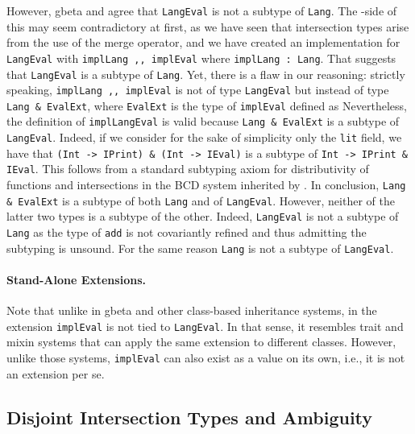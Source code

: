 However, gbeta and \name agree that \lstinline{LangEval} is not a subtype of
\lstinline{Lang}. The \name-side of this may seem contradictory at first, as we
have seen that intersection types arise from the use of the merge operator, and
we have created an implementation for \lstinline{LangEval} with
\lstinline{implLang ,, implEval} where \lstinline{implLang : Lang}. That
suggests that \lstinline{LangEval} is a subtype of \lstinline{Lang}.
Yet, there is a flaw in our reasoning:
strictly speaking, \lstinline{implLang ,, implEval} is not of
type \lstinline{LangEval} but instead of type \lstinline{Lang & EvalExt}, where
\lstinline{EvalExt} is the type of \lstinline{implEval} defined as
Nevertheless, the definition of \lstinline{implLangEval} is valid because
\lstinline{Lang & EvalExt} is a subtype of \lstinline{LangEval}.
Indeed, if we consider for the sake of simplicity only the \lstinline{lit}
field, we have that \lstinline{(Int -> IPrint) & (Int -> IEval)} is a
subtype of \lstinline{Int -> IPrint & IEval}. This follows from a standard
subtyping axiom for distributivity of functions and intersections in the BCD system inherited by \name.
In conclusion, \lstinline{Lang & EvalExt} is a subtype of both \lstinline{Lang}
and of \lstinline{LangEval}. However, neither of the latter two types is a subtype of the other.
Indeed, \lstinline{LangEval} is not a subtype of \lstinline{Lang} as the type
of \lstinline{add} is not covariantly refined and thus admitting the subtyping
is unsound. For the same reason \lstinline{Lang} is not a subtype of \lstinline{LangEval}.

\paragraph{Stand-Alone Extensions.}
Note that unlike in gbeta and other class-based inheritance systems, in \name
the extension \lstinline{implEval} is not tied to \lstinline{LangEval}. In that
sense, it resembles trait and mixin systems that can apply the same extension
to different classes. However, unlike those systems, \lstinline{implEval} can also
exist as a value on its own, i.e., it is not an extension per se.

\subsection{Disjoint Intersection Types and Ambiguity}


